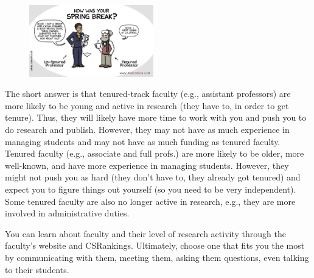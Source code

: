 \documentclass[11pt]{article}
\newenvironment{commentbox}[1][]{
\small
    \begin{cbox}
    \textbf{#1}: 
 }{
   \end{cbox}
}
\begin{document}
\begin{figure}
    \vspace{-0.3in}
      \begin{center}
        \includegraphics[width=0.48\textwidth]{c8.png}
      \end{center}
    \vspace{-0.2in}
    \end{figure}
The short answer is that tenured-track faculty (e.g., assistant professors) are more likely to be young and active in research (they have to, in order to get tenure). Thus, they will likely have more time to work with you and push you to do research and publish. However, they may not have as much experience in managing students and may not have as much funding as tenured faculty.
Tenured faculty (e.g., associate and full profs.) are more likely to be older, more well-known, and have more experience in managing students.  However, they might not push you as hard (they don't have to, they already got tenured) and expect you to figure things out yourself (so you need to be very independent).  Some tenured faculty are also no longer active in research, e.g., they are more involved in administrative duties. 

You can learn about faculty and their level of research activity through the faculty's website and CSRankings.
Ultimately, choose one that fits you the most by communicating with them, meeting them, asking them questions, even talking to their students. 


\end{document}
